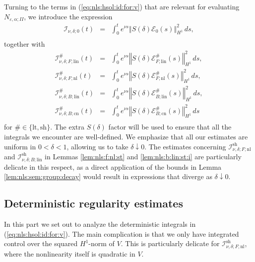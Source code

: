 \documentclass[10pt]{articleHJ}
\newcommand{\e}{\ensuremath{\varepsilon}}
\newcommand{\norm}[1]{\left\Vert#1\right\Vert}		%
\newcommand{\sref}[1]{(\ref{#1})}                       %
\numberwithin{equation}{section}
\begin{document}
Turning to the terms in \sref{eq:nls:hsol:id:for:v}
that are relevant
for evaluating $N_{\e,\alpha;II}$,
we introduce the expression
\begin{equation}
\begin{array}{lcl}
\mathcal{I}_{\nu,\delta;0}(t) &  = &
   \int_0^t e^{\nu s}
    \norm{ S(\delta) \mathcal{E}_0(s) }_{H^1}^2 \, ds ,
\\[0.2cm]
\end{array}
\end{equation}
together with
\begin{equation}
\begin{array}{lcl}
\mathcal{I}^{\#}_{\nu,\delta;F;\mathrm{lin}}(t) &  = &
   \int_0^t e^{\nu s}
    \norm{ S(\delta) \mathcal{E}^{\#}_{F;\mathrm{lin}}(s) }_{H^1}^2 \, ds ,
\\[0.2cm]
%
\mathcal{I}^{\#}_{\nu,\delta;F;\mathrm{nl} }(t) &  = &
  \int_0^t e^{\nu s}
    \norm{ S(\delta) \mathcal{E}^{\#}_{F;\mathrm{nl}}(s) }_{H^1}^2 \, ds ,
\\[0.2cm]
%
\mathcal{I}^{\#}_{\nu,\delta;B;\mathrm{lin}}(t)
  & = &
    \int_0^t e^{\nu s}
    \norm{ S(\delta) \mathcal{E}^{\#}_{B;\mathrm{lin}}(s) }_{H^1}^2 \, ds  ,
\\[0.2cm]
 \mathcal{I}^{\#}_{\nu,\delta;B;\mathrm{cn}}(t)
  & = &
    \int_0^t e^{\nu s}
    \norm{ S(\delta) \mathcal{E}^{\#}_{B;\mathrm{cn}}(s) }_{H^1}^2 \, ds
\\[0.2cm]
%
\end{array}
\end{equation}
for $\# \in \{\mathrm{lt}, \mathrm{sh}\}$. The extra $S(\delta)$ factor will be used
to ensure that all the integrals we encounter are well-defined.
We emphasize that all our estimates are uniform in $0 < \delta < 1$,
allowing us to take $\delta \downarrow 0$.
The estimates concerning $\mathcal{I}^{\mathrm{sh}}_{\nu,\delta;F;\mathrm{nl}}$
and $\mathcal{I}^{\mathrm{sh}}_{\nu,\delta;B;\mathrm{lin}}$
in Lemmas \ref{lem:nls:f:nl:st} and \ref{lem:nls:b:lin:st:i}
are particularly delicate in this respect, as a direct
application of the bounds in Lemma \ref{lem:nls:sem:group:decay}
would result in expressions that diverge as $\delta \downarrow 0$.



\subsection{Deterministic regularity estimates}
\label{sec:nls:reg:ests:det}
In this part we set out to analyze the deterministic
integrals in \sref{eq:nls:hsol:id:for:v}.
The main complication is that we only have integrated
control over the squared $H^1$-norm of $V$. This is particularly
delicate for
$\mathcal{I}^{\mathrm{sh}}_{\nu, \delta;F;\mathrm{nl}}$,
where the nonlinearity itself is quadratic in $V$.
\end{document}
